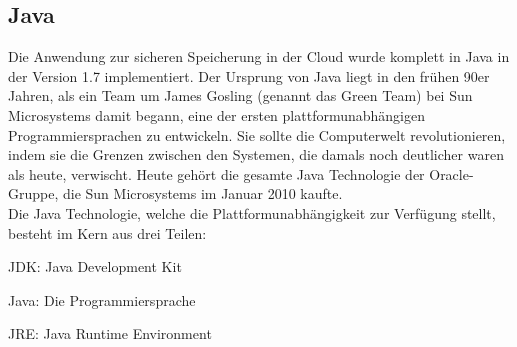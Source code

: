 \documentclass[12pt,a4paper,bibliography=totocnumbered,listof=totocnumbered]{scrartcl}
\begin{document}
\subsection{Java}\label{JavaV}
Die Anwendung zur sicheren Speicherung in der Cloud wurde komplett in Java in der Version 1.7 implementiert. Der Ursprung von Java liegt in den frühen 90er Jahren, als ein Team um James Gosling (genannt das Green Team) bei Sun Microsystems damit begann, eine der ersten plattformunabhängigen Programmiersprachen zu entwickeln. Sie sollte die Computerwelt revolutionieren, indem sie die Grenzen zwischen den Systemen, die damals noch deutlicher waren als heute, verwischt. Heute gehört die gesamte Java Technologie der Oracle-Gruppe, die Sun Microsystems im Januar 2010 kaufte.\\
Die Java Technologie, welche die Plattformunabhängigkeit zur Verfügung stellt, besteht im Kern aus drei Teilen:
\begin{compactitem}
	\item JDK: Java Development Kit
	\item Java: Die Programmiersprache
	\item JRE: Java Runtime Environment
\end{compactitem}
\end{document}

